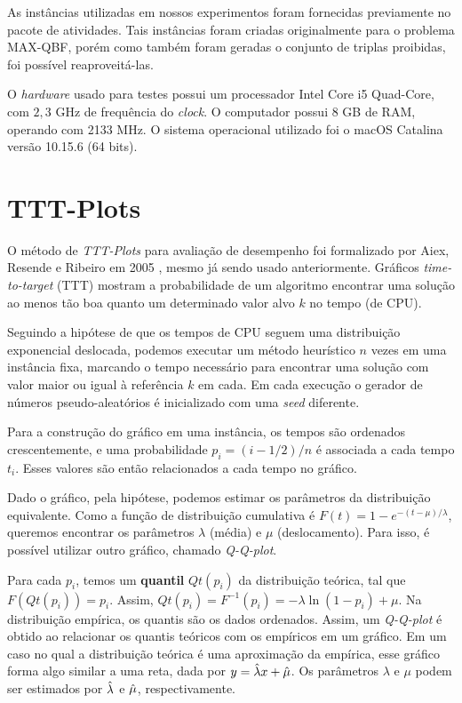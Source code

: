 \documentclass{MO824}
\begin{document}
    As instâncias utilizadas em nossos experimentos foram fornecidas previamente no pacote de atividades. Tais instâncias foram criadas originalmente para o problema MAX-QBF, porém como também foram geradas o conjunto de triplas proibidas, foi possível reaproveitá-las.
        
    O \textit{hardware} usado para testes possui um processador Intel Core i5 Quad-Core, com $2,3$ GHz de frequência do \textit{clock}. O computador possui 8 GB de RAM, operando com 2133 MHz. O sistema operacional utilizado foi o macOS Catalina versão 10.15.6 (64 bits).

\section{TTT-Plots}
    O método de \textit{TTT-Plots} para avaliação de desempenho foi formalizado por Aiex, Resende e Ribeiro em 2005 \cite{ttt}, mesmo já sendo usado anteriormente. Gráficos \textit{time-to-target} (TTT) mostram a probabilidade de um algoritmo encontrar uma solução ao menos tão boa quanto um determinado valor alvo $k$ no tempo (de CPU).
    
    Seguindo a hipótese de que os tempos de CPU seguem uma distribuição exponencial deslocada, podemos executar um método heurístico $n$ vezes em uma instância fixa, marcando o tempo necessário para encontrar uma solução com valor maior ou igual à referência $k$ em cada. Em cada execução o gerador de números pseudo-aleatórios é inicializado com uma \textit{seed} diferente.
    
    Para a construção do gráfico em uma instância, os tempos são ordenados crescentemente, e uma probabilidade $p_i=(i-1/2)/n$ é associada a cada tempo $t_i$. Esses valores são então relacionados a cada tempo no gráfico.
    
    Dado o gráfico, pela hipótese, podemos estimar os parâmetros da distribuição equivalente. Como a função de distribuição cumulativa é $F(t)=1-e^{-(t-\mu)/\lambda}$, queremos encontrar os parâmetros $\lambda$ (média) e $\mu$ (deslocamento). Para isso, é possível utilizar outro gráfico, chamado \textit{Q-Q-plot}.
    
    Para cada $p_i$, temos um \textbf{quantil} $Qt(p_i)$ da distribuição teórica, tal que $F(Qt(p_i)) = p_i$. Assim, $Qt(p_i)=F^{-1}(p_i)=-\lambda\ln{(1-p_i)}+\mu$. Na distribuição empírica, os quantis são os dados ordenados. Assim, um \textit{Q-Q-plot} é obtido ao relacionar os quantis teóricos com os empíricos em um gráfico. Em um caso no qual a distribuição teórica é uma aproximação da empírica, esse gráfico forma algo similar a uma reta, dada por $y=\Hat{\lambda}x+\Hat{\mu}$. Os parâmetros $\lambda$ e $\mu$ podem ser estimados por $\Hat{\lambda}$ e $\Hat{\mu}$, respectivamente.
    
\end{document}
